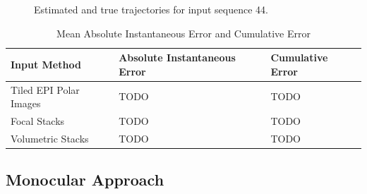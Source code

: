 \begin{figure}[H]
{    }
    \caption{Estimated and true trajectories for input sequence 44.}
    \setcounter{subfigure}{0}
\end{figure}

\begin{table}[htbp]
    \caption{Mean Absolute Instantaneous Error and Cumulative Error}
    \centering
    \begin{tabular}{@{}lll@{}}
        \toprule
        Input Method        & Absolute Instantaneous Error   & Cumulative Error  \\
        \midrule 
        Tiled EPI Polar Images & TODO & TODO \\
        Focal Stacks & TODO & TODO \\
        Volumetric Stacks & TODO & TODO \\
        \bottomrule
        
    \end{tabular}
\end{table}


\subsection{Monocular Approach}

